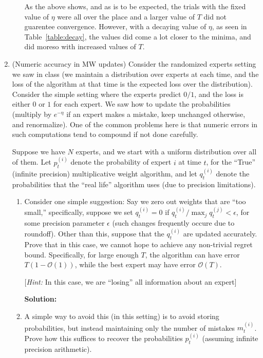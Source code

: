 \documentclass[12pt]{article}
\newcommand{\BigO}[1]{\mathcal{O}\left( #1 \right)}
\begin{document}
\begin{enumerate}
\begin{enumerate}
As the above shows, and as is to be expected, the trials with the fixed value of $\eta$ were all over the place and a larger value of $T$ did not guarentee convergence. However, with a decaying value of $\eta$, as seen in Table~\ref{table:decay}, the values did come a lot closer to the minima, and did moreso with increased values of $T$.





\end{enumerate}

\item (Numeric accuracy in MW updates) Consider the randomized experts setting we saw in class (we maintain a distribution over experts at each time, and the loss of the algorithm at that time is the expected loss over the distribution). Consider the simple setting where the experts predict $0/1$, and the loss is either $0$ or $1$ for each expert. We saw how to update the probabilities (multiply by $e^{-\eta}$ if an expert makes a mistake, keep unchanged otherwise, and renormalize). One of the common problems here is that numeric errors in such computations tend to compound if not done carefully.

Suppose we have $N$ experts, and we start with a uniform distribution over all of them. Let $p_{t}^{(i)}$ denote the probability of expert $i$ at time $t$, for the ``True'' (infinite precision) multiplicative weight algorithm, and let $q_{t}^{(i)}$ denote the probabilities that the ``real life'' algorithm uses (due to precision limitations).

\begin{enumerate}
  \item Consider one simple suggestion: Say we zero out weights that are ``too small,'' specifically, suppose we set $q_{t}^{(i)} = 0$ if $q_{t}^{(i)}/\max_{j}q_{t}^{(j)} < \epsilon$, for some precision parameter $\epsilon$ (such changes frequently occure due to roundoff). Other than this, suppose that the $q_{t}^{(i)}$ are updated accurately. Prove that in this case, we cannot hope to achieve any non-trivial regret bound. Specifically, for large enough $T$, the algorithm can have error $T(1 - \BigO{1})$, while the best expert may have error $\BigO{T}$.

[{\em Hint:} In this case, we are ``losing'' all information about an expert]

      {\bf Solution:}

\item A simple way to avoid this (in this setting) is to avoid storing probabilities, but instead maintaining only the number of mistakes $m_{t}^{(i)}$. Prove how this suffices to recover the probabilities $p_{t}^{(i)}$ (assuming infinite precision arithmetic).


\end{enumerate}
\end{enumerate}
\end{document}
